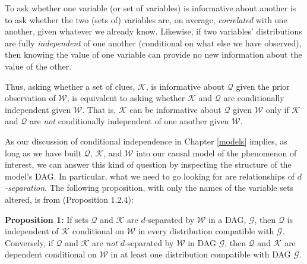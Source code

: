\documentclass[
  12pt,
]{book}
\begin{document}
To ask whether one variable (or set of variables) is informative about another is to ask whether the two (sets of) variables are, on average, \emph{correlated} with one another, given whatever we already know. Likewise, if two variables' distributions are fully \emph{independent} of one another (conditional on what else we have observed), then knowing the value of one variable can provide no new information about the value of the other.

Thus, asking whether a set of clues, \(\mathcal K\), is informative about \(\mathcal Q\) given the prior observation of \(\mathcal W\), is equivalent to asking whether \(\mathcal K\) and \(\mathcal Q\) are conditionally independent given \(\mathcal W\). That is, \(\mathcal K\) can be informative about \(\mathcal Q\) given \(\mathcal W\) only if \(\mathcal K\) and \(\mathcal Q\) are \emph{not} conditionally independent of one another given \(\mathcal W\).

As our discussion of conditional independence in Chapter \ref{models} implies, as long as we have built \(\mathcal Q\), \(\mathcal K\), and \(\mathcal W\) into our causal model of the phenomenon of interest, we can answer this kind of question by inspecting the structure of the model's DAG. In particular, what we need to go looking for are relationships of \emph{\(d\)-separation}. The following proposition, with only the names of the variable sets altered, is from \citet{pearl2009causality} (Proposition 1.2.4):

\textbf{Proposition 1:} If sets \(\mathcal Q\) and \(\mathcal K\) are \(d\)-separated by \(\mathcal W\) in a DAG, \(\mathcal G\), then \(\mathcal Q\) is independent of \(\mathcal K\) conditional on \(\mathcal W\) in every distribution compatible with \(\mathcal G\). Conversely, if \(\mathcal Q\) and \(\mathcal K\) are \emph{not} \(d\)-separated by \(\mathcal W\) in DAG \(\mathcal G\), then \(\mathcal Q\) and \(\mathcal K\) are dependent conditional on \(\mathcal W\) in at least one distribution compatible with DAG \(\mathcal G\).
\end{document}
